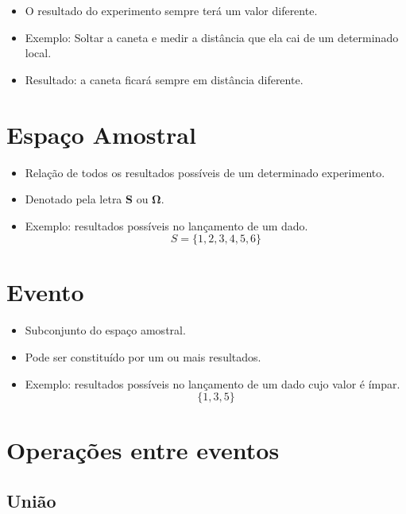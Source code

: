 \documentclass[
]{book}
\providecommand{\tightlist}{%
  \setlength{\itemsep}{0pt}\setlength{\parskip}{0pt}}
\begin{document}
\begin{itemize}
\tightlist
\item
  O resultado do experimento sempre terá um valor diferente.
\item
  Exemplo: Soltar a caneta e medir a distância que ela cai de um determinado local.
\item
  Resultado: a caneta ficará sempre em distância diferente.
\end{itemize}

\hypertarget{espauxe7o-amostral}{%
\section{Espaço Amostral}\label{espauxe7o-amostral}}

\begin{itemize}
\item
  Relação de todos os resultados possíveis de um determinado experimento.
\item
  Denotado pela letra \textbf{S} ou \(\boldsymbol{\Omega}\).
\item
  Exemplo: resultados possíveis no lançamento de um dado.
  \[ S = \{1, 2, 3, 4, 5, 6\} \]
\end{itemize}

\hypertarget{evento}{%
\section{Evento}\label{evento}}

\begin{itemize}
\item
  Subconjunto do espaço amostral.
\item
  Pode ser constituído por um ou mais resultados.
\item
  Exemplo: resultados possíveis no lançamento de um dado cujo valor é ímpar.
  \[ \{1, 3, 5\} \]
\end{itemize}

\hypertarget{operauxe7uxf5es-entre-eventos}{%
\section{Operações entre eventos}\label{operauxe7uxf5es-entre-eventos}}

\hypertarget{uniuxe3o}{%
\subsection{União}\label{uniuxe3o}}
\end{document}
